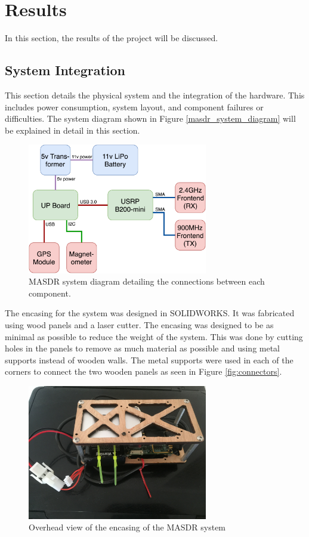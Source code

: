 \chapter{Results}
In this section, the results of the project will be discussed.

\section{System Integration}
This section details the physical system and the integration of the hardware. This includes power consumption, system layout, and component failures or difficulties. The system diagram shown in Figure \ref{masdr_system_diagram} will be explained in detail in this section.
\begin{figure}[ht!]
	\centering
	\includegraphics[width=0.70\textwidth]{img/masdr_system_diagram.png}
	\caption{MASDR system diagram detailing the connections between each component.}
	\label{fig:masdr_system_diagram}
\end{figure}\par
The encasing for the system was designed in SOLIDWORKS. It was fabricated using wood panels and a laser cutter. The encasing was designed to be as minimal as possible to reduce the weight of the system. This was done by cutting holes in the panels to remove as much material as possible and using metal supports instead of wooden walls. The metal supports were used in each of the corners to connect the two wooden panels as seen in Figure \ref{fig:connectors}.
\begin{figure}[ht!]
	\centering
	\includegraphics[width=0.70\textwidth]{img/Overhead_of_box.JPG}
	\caption{Overhead view of the encasing of the MASDR system}
	\label{fig:overhead_of_box}
\end{figure}\par
